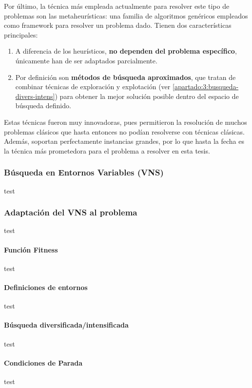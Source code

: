 Por último, la técnica más empleada actualmente para resolver este tipo de problemas son las metaheurísticas: una familia de algoritmos genéricos empleados como framework para resolver un problema dado. Tienen dos características principales: \cite{bibid}

\begin{enumerate}
	\item A diferencia de los heurísticos, \textbf{no dependen del problema específico}, únicamente han de ser adaptados parcialmente.
	\item Por definición son \textbf{métodos de búsqueda aproximados}, que tratan de combinar técnicas de exploración y explotación (ver \autoref{apartado:3:busqueda-divers-intens}) para obtener la mejor solución posible dentro del espacio de búsqueda definido.
\end{enumerate}

Estas técnicas fueron muy innovadoras, pues permitieron la resolución de muchos problemas clásicos que hasta entonces no podían resolverse con técnicas clásicas. Además, soportan perfectamente instancias grandes, por lo que hasta la fecha es la técnica más prometedora para el problema a resolver en esta tesis.







\subsubsection{Búsqueda en Entornos Variables (VNS)}
test
\subsubsection{Adaptación del VNS al problema}
test
\paragraph{Función Fitness} 
test

\paragraph{Definiciones de entornos}
test

\paragraph{Búsqueda diversificada/intensificada} \label{apartado:3:busqueda-divers-intens}
test

\paragraph{Condiciones de Parada}
test










